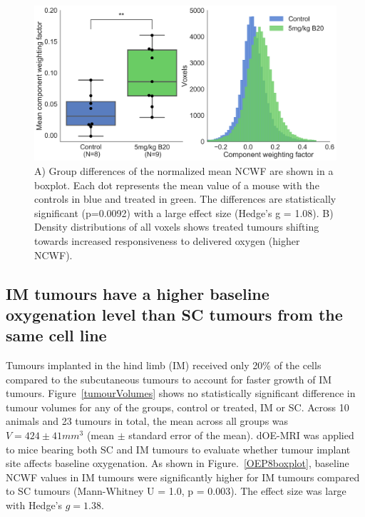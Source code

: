 \begin{figure}[htbp]
   \centering
   \includegraphics[width=\textwidth]{oemri_thesis3/oemri_thesis3-images/2_aarts3_b20_boxplot_dOEMRI.png} %
   \caption{A) Group differences of the normalized mean \acs{NCWF} are shown in a boxplot.
   Each dot represents the mean value of a mouse with the controls in blue and treated in green.
   The differences are statistically significant (p=0.0092) with a large effect size (Hedge's g = 1.08).
   B) Density distributions of all voxels shows treated tumours shifting towards increased responsiveness to delivered oxygen (higher \acs{NCWF}).}
   \label{aarts3boxplot}
\end{figure}

\subsection{\acs{IM} tumours have a higher baseline oxygenation level than \acs{SC} tumours from the same cell line}

Tumours implanted in the hind limb (\acs{IM}) received only 20\% of the cells compared to the subcutaneous tumours to account for faster growth of \acs{IM} tumours.
Figure~\ref{tumourVolumes} shows no statistically significant difference in tumour volumes for any of the groups, control or treated, \acs{IM} or \acs{SC}. 
Across 10 animals and 23 tumours in total, the mean across all groups was $V = 424 \pm 41 mm^3$ (mean $\pm$ standard error of the mean). 
\ac{dOE-MRI} was applied to mice bearing both \acs{SC} and \acs{IM} tumours to evaluate whether tumour implant site affects baseline oxygenation. 
As shown in Figure.~\ref{OEP8boxplot}, baseline \acs{NCWF} values in \acs{IM} tumours were significantly higher for \acs{IM} tumours compared to \acs{SC} tumours (Mann-Whitney U = 1.0, p = 0.003).
The effect size was large with Hedge's ${g=1.38}$.

